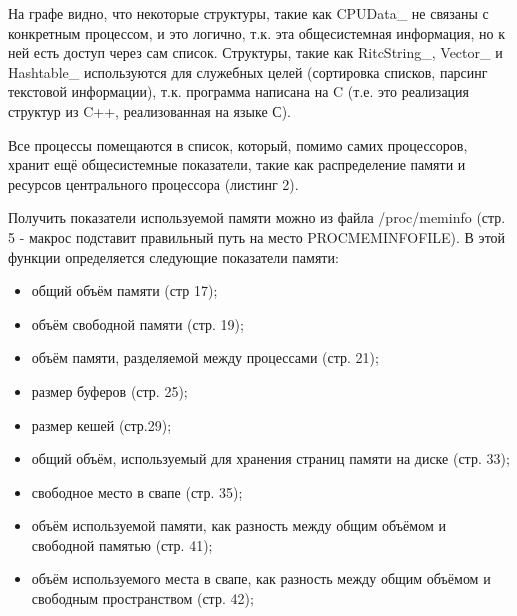 \documentclass[a4paper, 12pt]{article}		%
\begin{document}
На графе видно, что некоторые структуры, такие как CPUData\_ не связаны с конкретным процессом, и это логично, т.к. эта общесистемная информация, но к ней есть доступ через сам список. Структуры, такие как RitcString\_, Vector\_ и Hashtable\_ используются для служебных целей (сортировка списков, парсинг текстовой информации), т.к. программа написана на C (т.е. это реализация структур из C++, реализованная на языке С).

Все процессы помещаются в список, который, помимо самих процессоров, хранит ещё общесистемные показатели, такие как распределение памяти и ресурсов центрального процессора (листинг 2).

Получить показатели используемой памяти можно из файла /proc/meminfo (стр. 5 - макрос подставит правильный путь на место PROCMEMINFOFILE). В этой функции определяется следующие показатели памяти:
\begin{itemize}
\item общий объём памяти (стр 17);
\item объём свободной памяти (стр. 19);
\item объём памяти, разделяемой между процессами (стр. 21);
\item размер буферов (стр. 25);
\item размер кешей (стр.29);
\item общий объём, используемый для хранения страниц памяти на диске (стр. 33);
\item свободное место в свапе (стр. 35);
\item объём используемой памяти, как разность между общим объёмом и свободной памятью (стр. 41);
\item объём используемого места в свапе, как разность между общим объёмом и свободным пространством (стр. 42);
\end{itemize}
\end{document}
